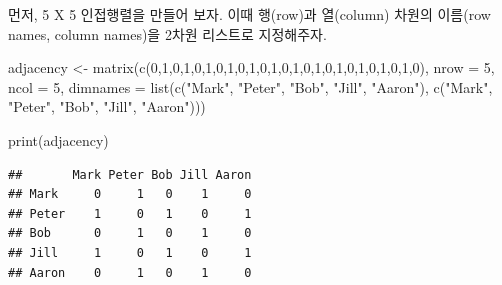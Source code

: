 \documentclass[
]{book}
\newenvironment{Shaded}{\begin{snugshade}}{\end{snugshade}}
\newcommand{\AttributeTok}[1]{\textcolor[rgb]{0.77,0.63,0.00}{#1}}
\newcommand{\DecValTok}[1]{\textcolor[rgb]{0.00,0.00,0.81}{#1}}
\newcommand{\FunctionTok}[1]{\textcolor[rgb]{0.00,0.00,0.00}{#1}}
\newcommand{\NormalTok}[1]{#1}
\newcommand{\OtherTok}[1]{\textcolor[rgb]{0.56,0.35,0.01}{#1}}
\newcommand{\StringTok}[1]{\textcolor[rgb]{0.31,0.60,0.02}{#1}}
\begin{document}
먼저, 5 X 5 인접행렬을 만들어 보자. 이때 행(row)과 열(column) 차원의 이름(row names, column names)을 2차원 리스트로 지정해주자.

\begin{Shaded}
\begin{Highlighting}[]
\NormalTok{adjacency }\OtherTok{\textless{}{-}} \FunctionTok{matrix}\NormalTok{(}\FunctionTok{c}\NormalTok{(}\DecValTok{0}\NormalTok{,}\DecValTok{1}\NormalTok{,}\DecValTok{0}\NormalTok{,}\DecValTok{1}\NormalTok{,}\DecValTok{0}\NormalTok{,}\DecValTok{1}\NormalTok{,}\DecValTok{0}\NormalTok{,}\DecValTok{1}\NormalTok{,}\DecValTok{0}\NormalTok{,}\DecValTok{1}\NormalTok{,}\DecValTok{0}\NormalTok{,}\DecValTok{1}\NormalTok{,}\DecValTok{0}\NormalTok{,}\DecValTok{1}\NormalTok{,}\DecValTok{0}\NormalTok{,}\DecValTok{1}\NormalTok{,}\DecValTok{0}\NormalTok{,}\DecValTok{1}\NormalTok{,}\DecValTok{0}\NormalTok{,}\DecValTok{1}\NormalTok{,}\DecValTok{0}\NormalTok{,}\DecValTok{1}\NormalTok{,}\DecValTok{0}\NormalTok{,}\DecValTok{1}\NormalTok{,}\DecValTok{0}\NormalTok{), }\AttributeTok{nrow =} \DecValTok{5}\NormalTok{, }\AttributeTok{ncol =} \DecValTok{5}\NormalTok{, }\AttributeTok{dimnames =} \FunctionTok{list}\NormalTok{(}\FunctionTok{c}\NormalTok{(}\StringTok{"Mark"}\NormalTok{, }\StringTok{"Peter"}\NormalTok{, }\StringTok{"Bob"}\NormalTok{, }\StringTok{"Jill"}\NormalTok{, }\StringTok{"Aaron"}\NormalTok{), }\FunctionTok{c}\NormalTok{(}\StringTok{"Mark"}\NormalTok{, }\StringTok{"Peter"}\NormalTok{, }\StringTok{"Bob"}\NormalTok{, }\StringTok{"Jill"}\NormalTok{, }\StringTok{"Aaron"}\NormalTok{)))}

\FunctionTok{print}\NormalTok{(adjacency)}
\end{Highlighting}
\end{Shaded}

\begin{verbatim}
##       Mark Peter Bob Jill Aaron
## Mark     0     1   0    1     0
## Peter    1     0   1    0     1
## Bob      0     1   0    1     0
## Jill     1     0   1    0     1
## Aaron    0     1   0    1     0
\end{verbatim}
\end{document}
